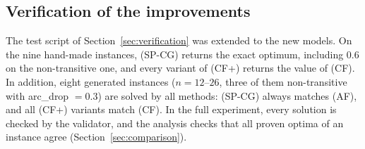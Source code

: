 \subsection{Verification of the improvements}
\label{sec:verif-improved}

The test script of Section~\ref{sec:verification} was extended to the new
models. On the nine hand-made instances, (SP-CG) returns the exact optimum,
including $0.6$ on the non-transitive one, and every variant of (CF+) returns
the value of (CF). In addition, eight generated instances ($n=12$--$26$,
three of them non-transitive with arc\_drop $=0.3$) are solved by all
methods: (SP-CG) always matches (AF), and all (CF+) variants match (CF). In
the full experiment, every solution is checked by the validator, and the
analysis checks that all proven optima of an instance agree
(Section~\ref{sec:comparison}).
